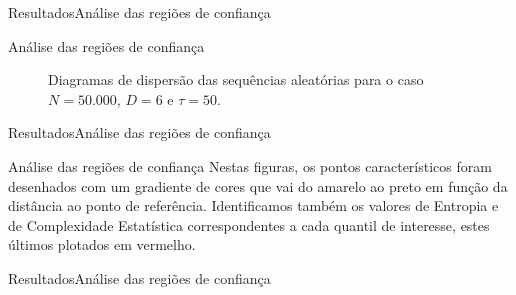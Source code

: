 \documentclass[10pt,xcolor={dvipsnames}]{beamer}
\begin{document}
\begin{frame}{Resultados}{Análise das regiões de confiança}
\begin{block}{Análise das regiões de confiança}
	\begin{figure}
		\centering
		\caption{Diagramas de dispersão das sequências aleatórias para o caso $N=50.000$, $D=6$ e $\tau=50$.}\label{Fig:QuantD3tau10log}
	\end{figure}
\end{block}
\end{frame}

\begin{frame}{Resultados}{Análise das regiões de confiança}
\begin{block}{Análise das regiões de confiança}
	Nestas figuras, os pontos característicos foram desenhados com um gradiente de cores que vai do amarelo ao preto em função da distância ao ponto de referência.
	Identificamos também os valores de Entropia e de Complexidade Estatística correspondentes a cada quantil de interesse, estes últimos plotados em vermelho.
\end{block}
\end{frame}

\begin{frame}{Resultados}{Análise das regiões de confiança}
\begin{block}{}
	
\end{block}
\end{frame}
\end{document}
